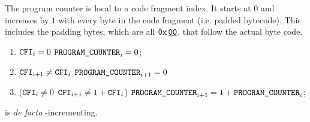 The program counter \romColumnProgramCounter{} is local to a code fragment index.
It starts at $0$ and increases by $1$ with every byte in the code fragment (i.e. padded bytecode).
This includes the padding bytes, which are all $\texttt{0x\,}\underline{\texttt{00}}$, that follow the actual byte code.
\begin{enumerate}
    \item \If $\texttt{CFI}_{i} = 0$ \Then $\texttt{PROGRAM\_COUNTER}_{i} = 0$;
    \item \If $\texttt{CFI}_{i + 1} \neq \texttt{CFI}_{i}$ \Then $\texttt{PROGRAM\_COUNTER}_{i + 1} = 0$
    \item \If \Big($\texttt{CFI}_{i} \neq 0$ \et $\texttt{CFI}_{i + 1} \neq 1 + \texttt{CFI}_{i}$\Big) \Then $\texttt{PROGRAM\_COUNTER}_{i + 1} = 1 + \texttt{PROGRAM\_COUNTER}_{i}$;
\end{enumerate}
\saNote{}
\romColumnProgramCounter{} is \emph{de facto} \cfi-incrementing.
